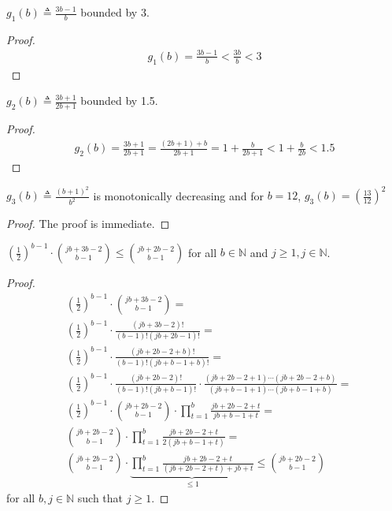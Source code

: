 \begin{claim}\label{claim:g-1}
$g_1(b) \triangleq \frac{3b-1}{b}$ bounded by 3.
\end{claim}

\begin{proof}
\begin{align*}
    g_1(b) = \frac{3b-1}{b} < \frac{3b}{b} < 3
\end{align*}
\end{proof}

\begin{claim}\label{claim:g-2}
$g_2(b) \triangleq \frac{3b+1}{2b+1}$ bounded by 1.5.
\end{claim}

\begin{proof}
\begin{align*}
    g_2(b) = \frac{3b+1}{2b+1} = \frac{(2b+1) + b }{2b+1} = 1 + \frac{b}{2b+1} < 1 + \frac{b}{2b} < 1.5
\end{align*}
\end{proof}

\begin{claim}\label{claim:g-3}
$g_3(b) \triangleq \frac{(b+1)^2}{b^2}$ is monotonically decreasing and for $b=12$, $g_3(b)= \left(\frac{13}{12}\right)^2$ 
\end{claim}

\begin{proof}
The proof is immediate. 
\end{proof}

\begin{claim} \label{claim:E-H-j-help}
$\left(\frac{1}{2}\right)^{b-1} \cdot {{jb+3b-2} \choose {b-1}} \leq {{jb+2b-2} \choose {b-1}}$ for all $b\in \mathds{N}$ and $j\geq1, j\in \mathds{N}$. 
\end{claim}

\begin{proof}
\begin{align*}
    & \left(\frac{1}{2}\right)^{b-1} \cdot {{jb+3b-2} \choose {b-1}} = \\
    & \left(\frac{1}{2}\right)^{b-1} \cdot \frac{(jb+3b-2)!}{(b-1)!(jb+2b-1)!} =\\
    & \left(\frac{1}{2}\right)^{b-1} \cdot \frac{(jb+2b-2+b)!}{(b-1)!(jb+b-1+b)!} =\\
    & \left(\frac{1}{2}\right)^{b-1} \cdot \frac{(jb+2b-2)!}{(b-1)!(jb+b-1)!} \cdot 
    \frac{(jb+2b-2+1)\cdots(jb+2b-2+b)}{(jb+b-1+1)\cdots(jb+b-1+b)} =\\
    & \left(\frac{1}{2}\right)^{b-1} \cdot {{jb+2b-2} \choose {b-1}} \cdot \prod_{t=1}^b \frac{jb+2b-2+t}{jb+b-1+t} =\\
    & {{jb+2b-2} \choose {b-1}} \cdot \prod_{t=1}^b \frac{jb+2b-2+t}{2(jb+b-1+t)} =\\
    & {{jb+2b-2} \choose {b-1}} \cdot \underbrace{\prod_{t=1}^b \frac{jb+2b-2+t}{(jb+2b-2+t)+jb+t}}_{\leq1} \leq {{jb+2b-2} \choose {b-1}}
\end{align*}
for all $b,j\in \mathds{N}$ such that $j\geq1$.
\end{proof}